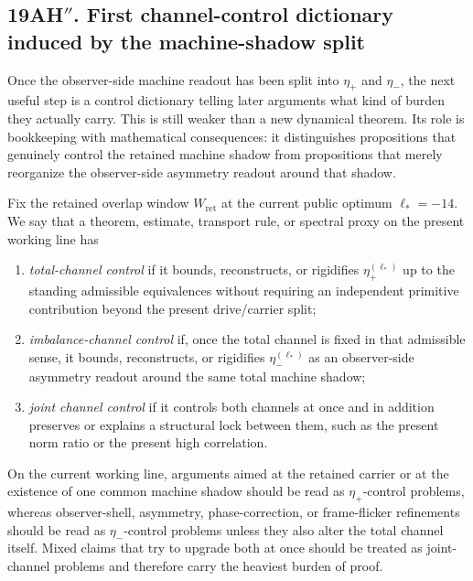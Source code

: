 \subsection*{19AH$''$. First channel-control dictionary induced by the machine-shadow split}
Once the observer-side machine readout has been split into \(\eta_+\) and \(\eta_-\), the next useful step is a control dictionary telling later arguments what kind of burden they actually carry. This is still weaker than a new dynamical theorem. Its role is bookkeeping with mathematical consequences: it distinguishes propositions that genuinely control the retained machine shadow from propositions that merely reorganize the observer-side asymmetry readout around that shadow.

\begin{definition}
Fix the retained overlap window \(W_{\mathrm{ret}}\) at the current public optimum \(\ell_*=-14\). We say that a theorem, estimate, transport rule, or spectral proxy on the present working line has
\begin{enumerate}[leftmargin=2em]
 \item \emph{total-channel control} if it bounds, reconstructs, or rigidifies \(\eta_+^{(\ell_*)}\) up to the standing admissible equivalences without requiring an independent primitive contribution beyond the present drive/carrier split;
 \item \emph{imbalance-channel control} if, once the total channel is fixed in that admissible sense, it bounds, reconstructs, or rigidifies \(\eta_-^{(\ell_*)}\) as an observer-side asymmetry readout around the same total machine shadow;
 \item \emph{joint channel control} if it controls both channels at once and in addition preserves or explains a structural lock between them, such as the present norm ratio or the present high correlation.
\end{enumerate}
\end{definition}

\begin{proposition}
On the current working line, arguments aimed at the retained carrier or at the existence of one common machine shadow should be read as \(\eta_+\)-control problems, whereas observer-shell, asymmetry, phase-correction, or frame-flicker refinements should be read as \(\eta_-\)-control problems unless they also alter the total channel itself. Mixed claims that try to upgrade both at once should be treated as joint-channel problems and therefore carry the heaviest burden of proof.
\end{proposition}

